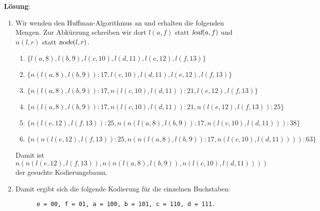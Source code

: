 \documentclass{article}
\begin{document}
\noindent
\textbf{L\"osung}:
\begin{enumerate}
\item Wir wenden den Huffman-Algorithmus an und erhalten die folgenden Mengen.  Zur Abk\"urzung
      schreiben wir dort $l(a,f)$ statt $\textsl{leaf}(a,f)$ und $n(l,r)$ statt $\textsl{node}(l,r)$.
      \begin{enumerate}
      \item $\{ l(a,8), l(b,9), l(c,10), l(d,11), l(e,12), l(f,13) \}$
      \item $\{ n(l(a,8), l(b,9)):17, l(c,10), l(d,11), l(e,12), l(f,13) \}$
      \item $\{ n(l(a,8), l(b,9)):17, n(l(c,10), l(d,11)):21, l(e,12), l(f,13) \}$
      \item $\{ n(l(a,8), l(b,9)):17, n(l(c,10), l(d,11)):21, n(l(e,12), l(f,13)):25 \}$
      \item $\{ n(l(e,12), l(f,13)):25, n(n(l(a,8), l(b,9)):17, n(l(c,10), l(d,11))):38 \}$
      \item $\{ n(n(l(e,12), l(f,13)):25, n(n(l(a,8), l(b,9)):17, n(l(c,10), l(d,11)))):63 \}$
      \end{enumerate}
      Damit ist 
      \\[0.2cm]
      \hspace*{1.3cm} $n(n(l(e,12), l(f,13)), n(n(l(a,8), l(b,9)), n(l(c,10), l(d,11))))$
      \\[0.2cm]
      der gesuchte Kodierungsbaum.
\item Damit ergibt sich die folgende Kodierung f\"ur die einzelnen Buchstaben:
      \begin{verbatim}
      e = 00, f = 01, a = 100, b = 101, c = 110, d = 111.
      \end{verbatim}
\end{enumerate}
\end{document}
